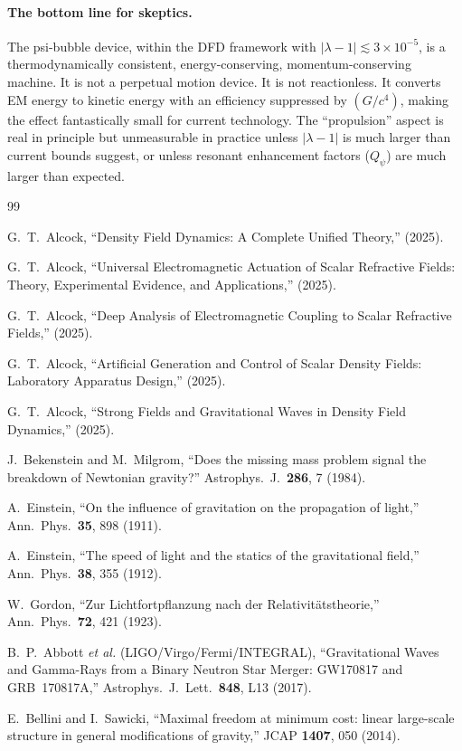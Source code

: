 \documentclass[aps,prd,twocolumn,superscriptaddress,floatfix,nofootinbib]{revtex4-2}
\newcommand{\lam}{\lambda}
\begin{document}
\paragraph{The bottom line for skeptics.} The psi-bubble device, within
the DFD framework with $|\lam-1| \lesssim 3\times10^{-5}$, is a
thermodynamically consistent, energy-conserving, momentum-conserving
machine. It is not a perpetual motion device. It is not reactionless.
It converts EM energy to kinetic energy with an efficiency suppressed
by $(G/c^4)$, making the effect fantastically small for current
technology. The ``propulsion'' aspect is real in principle but
unmeasurable in practice unless $|\lam-1|$ is much larger than current
bounds suggest, or unless resonant enhancement factors ($Q_\psi$) are
much larger than expected.



\begin{thebibliography}{99}

G.~T.~Alcock, ``Density Field Dynamics: A Complete Unified Theory,'' (2025).

G.~T.~Alcock, ``Universal Electromagnetic Actuation of Scalar Refractive
Fields: Theory, Experimental Evidence, and Applications,'' (2025).

G.~T.~Alcock, ``Deep Analysis of Electromagnetic Coupling to Scalar
Refractive Fields,'' (2025).

G.~T.~Alcock, ``Artificial Generation and Control of Scalar Density
Fields: Laboratory Apparatus Design,'' (2025).

G.~T.~Alcock, ``Strong Fields and Gravitational Waves in Density Field
Dynamics,'' (2025).

J.~Bekenstein and M.~Milgrom, ``Does the missing mass problem signal
the breakdown of Newtonian gravity?'' Astrophys.\ J.\ \textbf{286},
7 (1984).

A.~Einstein, ``On the influence of gravitation on the propagation of
light,'' Ann.\ Phys.\ \textbf{35}, 898 (1911).

A.~Einstein, ``The speed of light and the statics of the gravitational
field,'' Ann.\ Phys.\ \textbf{38}, 355 (1912).

W.~Gordon, ``Zur Lichtfortpflanzung nach der Relativit\"atstheorie,''
Ann.\ Phys.\ \textbf{72}, 421 (1923).

B.~P.~Abbott \textit{et al.} (LIGO/Virgo/Fermi/INTEGRAL),
``Gravitational Waves and Gamma-Rays from a Binary Neutron Star Merger:
GW170817 and GRB~170817A,'' Astrophys.\ J.\ Lett.\ \textbf{848}, L13
(2017).

E.~Bellini and I.~Sawicki, ``Maximal freedom at minimum cost:
linear large-scale structure in general modifications of gravity,''
JCAP \textbf{1407}, 050 (2014).

\end{thebibliography}
\end{document}
